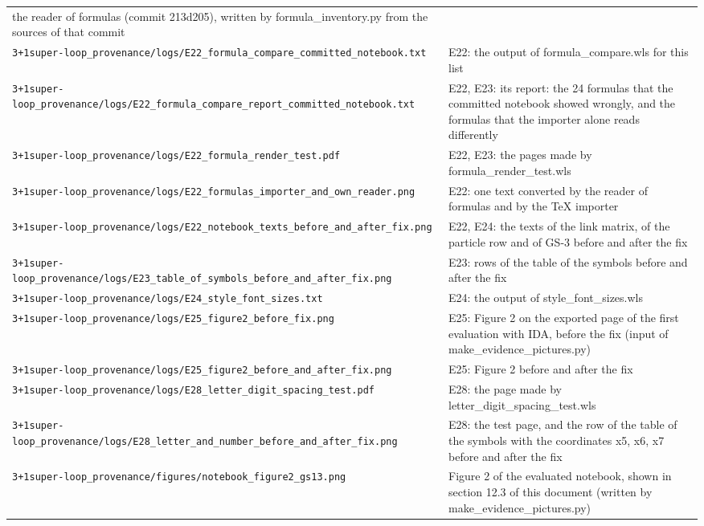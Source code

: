 \documentclass[
  10pt,
]{article}
\begin{document}
\begin{longtable}[]{@{}
  >{\raggedright\arraybackslash}p{}
  >{\raggedright\arraybackslash}p{}@{}}
the reader of formulas (commit 213d205), written by
formula\_inventory.py from the sources of that commit \\
\texttt{3+1super-loop\_provenance/logs/E22\_formula\_compare\_committed\_notebook.txt}
& E22: the output of formula\_compare.wls for this list \\
\texttt{3+1super-loop\_provenance/logs/E22\_formula\_compare\_report\_committed\_notebook.txt}
& E22, E23: its report: the 24 formulas that the committed notebook
showed wrongly, and the formulas that the importer alone reads
differently \\
\texttt{3+1super-loop\_provenance/logs/E22\_formula\_render\_test.pdf} &
E22, E23: the pages made by formula\_render\_test.wls \\
\texttt{3+1super-loop\_provenance/logs/E22\_formulas\_importer\_and\_own\_reader.png}
& E22: one text converted by the reader of formulas and by the TeX
importer \\
\texttt{3+1super-loop\_provenance/logs/E22\_notebook\_texts\_before\_and\_after\_fix.png}
& E22, E24: the texts of the link matrix, of the particle row and of
GS-3 before and after the fix \\
\texttt{3+1super-loop\_provenance/logs/E23\_table\_of\_symbols\_before\_and\_after\_fix.png}
& E23: rows of the table of the symbols before and after the fix \\
\texttt{3+1super-loop\_provenance/logs/E24\_style\_font\_sizes.txt} &
E24: the output of style\_font\_sizes.wls \\
\texttt{3+1super-loop\_provenance/logs/E25\_figure2\_before\_fix.png} &
E25: Figure 2 on the exported page of the first evaluation with IDA,
before the fix (input of make\_evidence\_pictures.py) \\
\texttt{3+1super-loop\_provenance/logs/E25\_figure2\_before\_and\_after\_fix.png}
& E25: Figure 2 before and after the fix \\
\texttt{3+1super-loop\_provenance/logs/E28\_letter\_digit\_spacing\_test.pdf}
& E28: the page made by letter\_digit\_spacing\_test.wls \\
\texttt{3+1super-loop\_provenance/logs/E28\_letter\_and\_number\_before\_and\_after\_fix.png}
& E28: the test page, and the row of the table of the symbols with the
coordinates x5, x6, x7 before and after the fix \\
\texttt{3+1super-loop\_provenance/figures/notebook\_figure2\_gs13.png} &
Figure 2 of the evaluated notebook, shown in section 12.3 of this
document (written by make\_evidence\_pictures.py) \\

\end{longtable}
\end{document}
